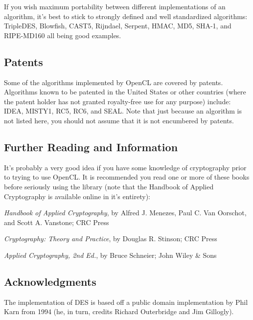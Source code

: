 \documentclass{article}
\begin{document}
If you wish maximum portability between different implementations of an
algorithm, it's best to stick to strongly defined and well standardized
algorithms: TripleDES, Blowfish, CAST5, Rijndael, Serpent, HMAC, MD5, SHA-1,
and RIPE-MD160 all being good examples.

\subsection{Patents}

Some of the algorithms implemented by OpenCL are covered by patents. Algorithms
known to be patented in the United States or other countries (where the patent
holder has not granted royalty-free use for any purpose) include: IDEA, MISTY1,
RC5, RC6, and SEAL. Note that just because an algorithm is not listed here, you
should not assume that it is not encumbered by patents.

\pagebreak

\subsection{Further Reading and Information}

It's probably a very good idea if you have some knowledge of cryptography prior
to trying to use OpenCL. It is recommended you read one or more of these books
before seriously using the library (note that the Handbook of Applied
Cryptography is available online in it's entirety):

\setlength{\parskip}{5pt}

\noindent
\textit{Handbook of Applied Cryptography}, by Alfred J. Menezes,
Paul C. Van Oorschot, and Scott A. Vanstone; CRC Press

\noindent
\textit{Cryptography: Theory and Practice}, by Douglas R. Stinson; CRC Press

\noindent
\textit{Applied Cryptography, 2nd Ed.}, by Bruce Schneier; John Wiley \& Sons

\setlength{\parskip}{0pt}

\subsection{Acknowledgments}

\setlength{\parskip}{5pt}

\noindent
The implementation of DES is based off a public domain implementation by Phil
Karn from 1994 (he, in turn, credits Richard Outerbridge and Jim Gillogly).
\end{document}
